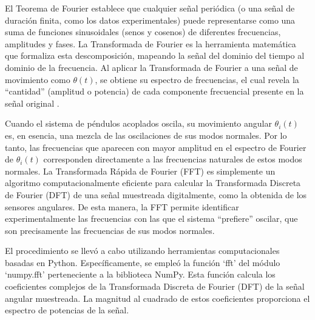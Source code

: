 El Teorema de Fourier establece que cualquier se\~nal
peri\'odica (o una se\~nal de duraci\'on finita, como los datos
experimentales) puede representarse como una suma de funciones
sinusoidales (senos y cosenos) de diferentes frecuencias,
amplitudes y fases. La Transformada de Fourier es la
herramienta matem\'atica que formaliza esta descomposici\'on,
mapeando la se\~nal del dominio del tiempo al dominio de la
frecuencia. Al aplicar la Transformada de Fourier a una se\~nal de
movimiento como $\theta(t)$, se obtiene su espectro de
frecuencias, el cual revela la ``cantidad'' (amplitud o potencia)
de cada componente frecuencial presente en la se\~nal original \cite{Stein2003}.

Cuando el sistema de p\'endulos acoplados oscila, su movimiento
angular $\theta_i(t)$ es, en esencia, una mezcla de las
oscilaciones de sus modos normales. Por lo tanto, las frecuencias
que aparecen con mayor amplitud en el espectro de Fourier de
$\theta_i(t)$ corresponden directamente a las frecuencias
naturales de estos modos normales. La Transformada R\'apida de
Fourier (FFT) es simplemente un algoritmo computacionalmente
eficiente para calcular la Transformada Discreta de Fourier (DFT)
de una se\~nal muestreada digitalmente, como la obtenida de los
sensores angulares. De esta manera, la FFT permite identificar
experimentalmente las frecuencias con las que el sistema
``prefiere'' oscilar, que son precisamente las frecuencias de sus
modos normales.

El procedimiento se llev\'o a cabo utilizando herramientas
computacionales basadas en Python. Espec\'ificamente, se emple\'o la
funci\'on `fft' del m\'odulo `numpy.fft' perteneciente a la
biblioteca NumPy. Esta funci\'on calcula los coeficientes complejos
de la Transformada Discreta de Fourier (DFT) de la se\~nal angular
muestreada. La magnitud al cuadrado de estos coeficientes
proporciona el espectro de potencias de la se\~nal.
